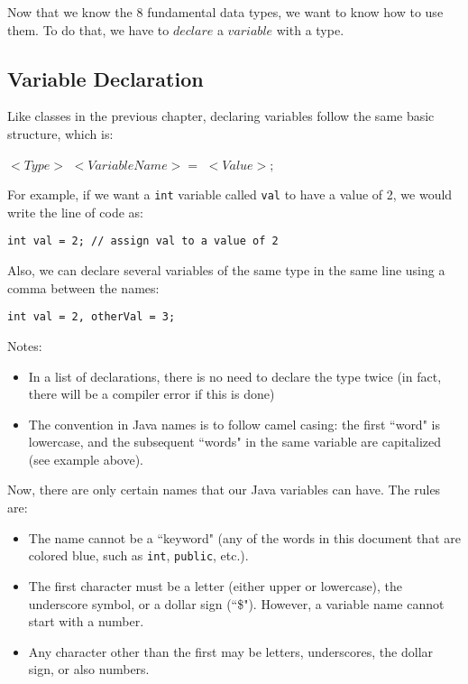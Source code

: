 \noindent Now that we know the 8 fundamental data types, we want to know how to use them. To do that, we have to $declare$ a $variable$ with a type.

\subsection{Variable Declaration}
Like classes in the previous chapter, declaring variables follow the same basic structure, which is:
\begin{center}
$<Type>$ $<VariableName> = $ $<Value>;$
\end{center}

\noindent For example, if we want a \verb|int| variable called \verb|val| to have a value of 2, we would write the line of code as:

\begin{lstlisting}
int val = 2; // assign val to a value of 2
\end{lstlisting}

\noindent Also, we can declare several variables of the same type in the same line using a comma between the names:
\begin{lstlisting}
int val = 2, otherVal = 3;
\end{lstlisting}
Notes: 
\begin{itemize}
\item In a list of declarations, there is no need to declare the type twice (in fact, there will be a compiler error if this is done)
\item The convention in Java names is to follow camel casing: the first ``word" is lowercase, and the subsequent ``words" in the same variable are capitalized (see example above).
\end{itemize}

\noindent Now, there are only certain names that our Java variables can have. The rules are:
\begin{itemize}
\item The name cannot be a ``keyword" (any of the words in this document that are colored blue, such as \verb|int|, \verb|public|, etc.).
\item The first character must be a letter (either upper or lowercase), the underscore symbol, or a dollar sign (``\$"). However, a variable name cannot start with a number. 
\item Any character other than the first may be letters, underscores, the dollar sign, or also numbers. 
\end{itemize}

